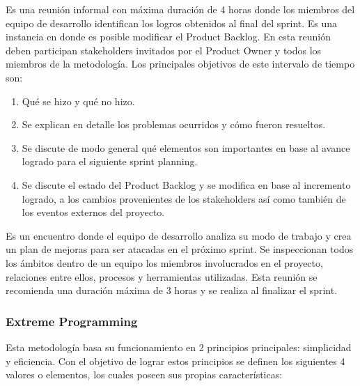 \begin{description}[leftmargin=10em,style=nextline]
  \item[4. \textit{Sprint Review}] Es una reunión informal con máxima duración de 4 horas donde los miembros del equipo de desarrollo identifican los logros obtenidos al final del sprint. Es una instancia en donde es posible modificar el Product Backlog. En esta reunión deben participan  stakeholders invitados por el Product Owner y todos los miembros de la metodología. Los principales objetivos de este intervalo de tiempo son:
    \begin{enumerate}
      \item Qué se hizo y qué no hizo.
      \item Se explican en detalle los problemas ocurridos y cómo fueron resueltos.
      \item Se discute de modo general qué elementos son importantes en base al avance logrado para el siguiente sprint planning.
      \item Se discute el estado del Product Backlog y se modifica en base al incremento logrado, a los cambios provenientes de los stakeholders así como también de los eventos externos del proyecto.
    \end{enumerate}

  \item[5. \textit{Sprint Retrospective}] Es un encuentro donde el equipo de desarrollo analiza su modo de trabajo y crea un plan de mejoras para ser atacadas en el próximo sprint. Se inspeccionan todos los ámbitos dentro de un equipo los miembros involucrados en el proyecto, relaciones entre ellos, procesos y herramientas utilizadas. Esta reunión se recomienda una duración máxima de 3 horas y se realiza al finalizar el sprint.
\end{description}

\subsubsection{Extreme Programming \label{sec:extreme_programming}}
Esta metodología basa su funcionamiento en 2 principios principales: simplicidad y eficiencia. Con el objetivo de lograr estos principios se definen los siguientes 4 valores o elementos, los cuales poseen sus propias características:

